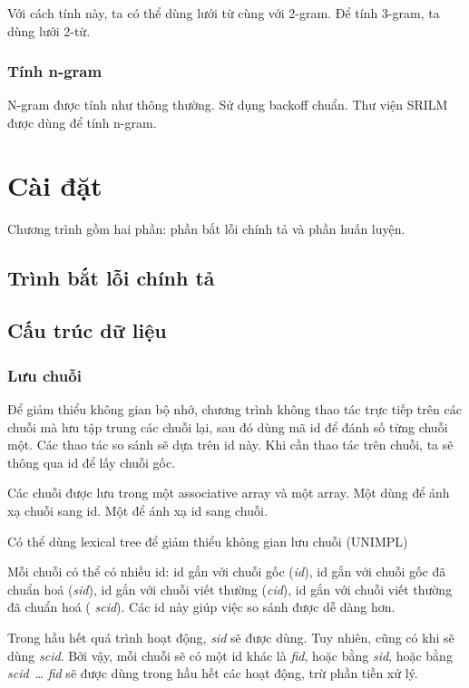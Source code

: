 \documentclass[a4paper,oneside]{book} %
\theoremstyle{break}
\begin{document}
Với cách tính này, ta có thể dùng lưới từ cùng với 2-gram. Để tính
3-gram, ta dùng lưới 2-từ. 

\subsection{Tính n-gram}

N-gram được tính như thông thường. Sử dụng backoff chuẩn. Thư viện
SRILM được dùng để tính n-gram.




\chapter{Cài đặt}
\label{cha:implementation}
\minitoc

Chương trình gồm hai phần: phần bắt lỗi chính tả và phần huấn luyện.

\section{Trình bắt lỗi chính tả}



\section{Cấu trúc dữ liệu}


\subsection{Lưu chuỗi}

Để giảm thiểu không gian bộ nhớ, chương trình không thao tác trực tiếp
trên các chuỗi mà lưu tập trung các chuỗi lại, sau đó dùng mã id để
đánh số từng chuỗi một. Các thao tác so sánh sẽ dựa trên id này. Khi
cần thao tác trên chuỗi, ta sẽ thông qua id để lấy chuỗi gốc.

Các chuỗi được lưu trong một associative array và một array. Một dùng
để ánh xạ chuỗi sang id. Một để ánh xạ id sang chuỗi.

Có thể dùng lexical tree để giảm thiểu không gian lưu chuỗi (UNIMPL)

Mỗi chuỗi có thể có nhiều id: id gắn với chuỗi gốc ({\em id}), id gắn
với chuỗi gốc đã chuẩn hoá ({\em sid}), id gắn với chuỗi viết thường
({\em cid}), id  gắn với chuỗi viết thường đã chuẩn hoá ({\em
  scid}). Các id này giúp việc so sánh được dễ dàng hơn. 

Trong hầu hết quá trình hoạt động, {\em sid} sẽ được dùng. Tuy nhiên,
cũng có khi sẽ dùng {\em scid}. Bởi vậy, mỗi chuỗi sẽ có một id khác
là {\em fid}, hoặc bằng {\em sid}, hoặc bằng {\em scid}~\ldots{} {\em
  fid} sẽ được dùng trong hầu hết các hoạt động, trừ phần tiền xử lý.
\end{document}
